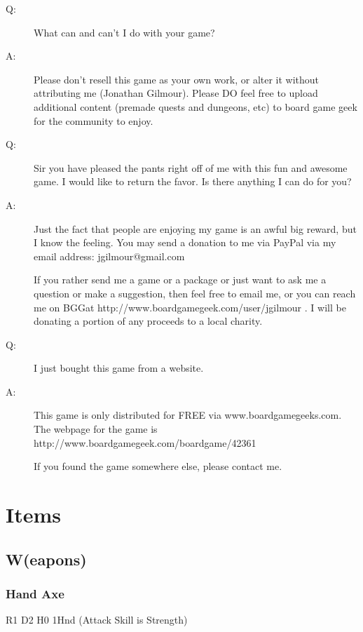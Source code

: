 \documentclass[a6paper,hidelinks]{article}
\begin{document}
\begin{description}
\item[Q:]  What can and can’t I do with your game?
\item[A:]  Please don't resell this game as your own work, or alter it without attributing me (Jonathan Gilmour). Please DO feel free to upload additional content (premade quests and dungeons, etc) to board game geek for the community to enjoy.
\end{description}

\begin{description}
\item[Q:]  Sir you have pleased the pants right off of me with this fun and awesome game. I would like to return the favor. Is there anything I can do for you?
\item[A:]  Just the fact that people are enjoying my game is an awful big reward, but I know the feeling. You may send a donation to me via PayPal via my email address: jgilmour@gmail.com

If you rather send me a game or a package or just want to ask me a question or make a suggestion, then feel free to email me, or you can reach me on BGGat
http://www.boardgamegeek.com/user/jgilmour . I will be donating a portion of any proceeds to a local charity.
\end{description}

\begin{description}
\item[Q:]  I just bought this game from a website.
\item[A:]  This game is only distributed for FREE via www.boardgamegeeks.com. The webpage for the game is http://www.boardgamegeek.com/boardgame/42361

If you found the game somewhere else, please contact me.
\end{description}

\section{Items}

\subsection{W(eapons)}

\subsubsection{Hand Axe}
R1 D2 H0 1Hnd (Attack Skill is Strength)
\end{document}
